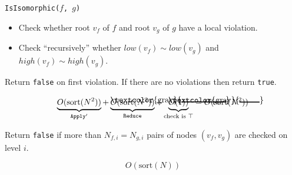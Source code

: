 \documentclass[english, aspectratio=169]{beamer}
\newcommand\hcancel[2][black]{\setbox0=\hbox{$#2$}%
  \rlap{\raisebox{.35\ht0}{\textcolor{#1}{\rule{\wd0}{1pt}}}}#2}
\newcommand{\sort}[0]{\text{sort}}
\begin{document}

\begin{frame}

  \begin{figure}
    \centering

    \begin{tikzpicture}[scale=1, every node/.style={transform shape}]
      
    \end{tikzpicture}
  \end{figure}
  
\end{frame}

\begin{frame}

  \texttt{IsIsomorphic($f$, $g$)}
  \begin{itemize}
  \item Check whether root $v_f$ of $f$ and root $v_g$ of $g$ have a local violation.
  \item Check ``recursively'' whether $\mathit{low}(v_f) \sim \mathit{low}(v_g)$
    and $\mathit{high}(v_f) \sim \mathit{high}(v_g)$.
  \end{itemize}
  Return \texttt{false} on first violation. If there are no violations then return \texttt{true}.

  \pause
  \begin{equation*}
    \underbrace{O(\sort(N^2))}_{\texttt{Apply}'}
    + \underbrace{\hcancel[gray]{O(\sort(N^2))}}_{\texttt{Reduce}}
    + \underbrace{\hcancel[gray]{O(1))}}_{\text{check is } \top}
    = O(\sort(N^2))
  \end{equation*}
  
\end{frame}

\begin{frame}
  \begin{figure}
    \centering

    \begin{tikzpicture}[scale=0.9, every node/.style={transform shape}]
      
    \end{tikzpicture}
  \end{figure}

  \pause
  Return \texttt{false} if more than $N_{f,i} = N_{g,i}$ pairs of nodes $(v_f,
  v_g)$ are checked on level $i$.

  \begin{equation*}
    O(\sort(N))
  \end{equation*}
  
\end{frame}
\end{document}
